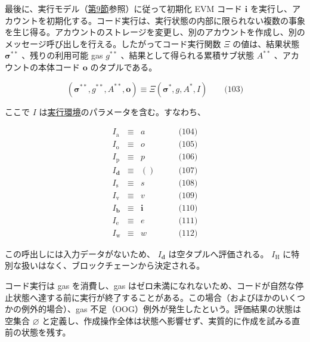 \documentclass[
]{ltjsarticle}
\begin{document}
最後に、実行モデル（\protect\hyperlink{ch:model}{第9節}参照）に従って初期化
EVM コード \(\mathbf{i}\)
を実行し、アカウントを初期化する。コード実行は、実行状態の内部に限られない複数の事象を生じ得る。アカウントのストレージを変更し、別のアカウントを作成し、別のメッセージ呼び出しを行える。したがってコード実行関数
\(\Xi\) の値は、結果状態 \(\boldsymbol{\sigma}^{**}\) 、残りの利用可能
gas \(g^{**}\) 、結果として得られる累積サブ状態 \(A^{**}\)
、アカウントの本体コード \(\mathbf{o}\) のタプルである。

\protect\hypertarget{eq-103}{}{}

\[(\boldsymbol{\sigma}^{**}, g^{**}, A^{**}, \mathbf{o}) \equiv \Xi(\boldsymbol{\sigma}^{*}, g, A^{*}, I) \qquad \text{(103)}\]

ここで \(I\)
は\protect\hyperlink{exec_env}{実行環境}のパラメータを含む。すなわち、

\protect\hypertarget{eq-104}{}{}\protect\hypertarget{eq-105}{}{}\protect\hypertarget{eq-106}{}{}\protect\hypertarget{eq-107}{}{}\protect\hypertarget{eq-108}{}{}\protect\hypertarget{eq-109}{}{}\protect\hypertarget{eq-110}{}{}\protect\hypertarget{eq-111}{}{}\protect\hypertarget{eq-112}{}{}

\[\begin{aligned}
I_{\mathrm{a}} & \equiv & a & \qquad \text{(104)} \\
I_{\mathrm{o}} & \equiv & o & \qquad \text{(105)} \\
I_{\mathrm{p}} & \equiv & p & \qquad \text{(106)} \\
I_{\mathbf{d}} & \equiv & () & \qquad \text{(107)} \\
I_{\mathrm{s}} & \equiv & s & \qquad \text{(108)} \\
I_{\mathrm{v}} & \equiv & v & \qquad \text{(109)} \\
I_{\mathbf{b}} & \equiv & \mathbf{i} & \qquad \text{(110)} \\
I_{\mathrm{e}} & \equiv & e & \qquad \text{(111)} \\
I_{\mathrm{w}} & \equiv & w & \qquad \text{(112)}
\end{aligned}\]

この呼出しには入力データがないため、 \(I_{\mathbf{d}}\)
は空タプルへ評価される。 \(I_{\mathrm{H}}\)
に特別な扱いはなく、ブロックチェーンから決定される。

コード実行は gas を消費し、gas
はゼロ未満になれないため、コードが自然な停止状態へ達する前に実行が終了することがある。この場合（およびほかのいくつかの例外的場合）、gas
不足（OOG）例外が発生したという。評価結果の状態は空集合 \(\varnothing\)
と定義し、作成操作全体は状態へ影響せず、実質的に作成を試みる直前の状態を残す。
\end{document}
